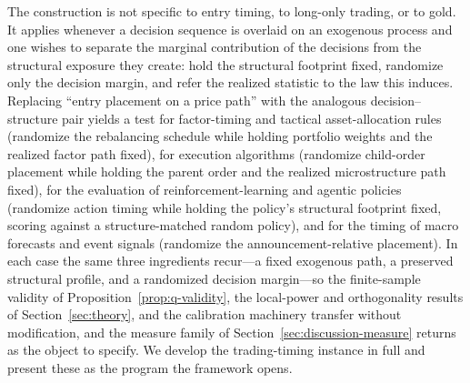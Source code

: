 The construction is not specific to entry timing, to long-only trading, or to gold. It
applies whenever a decision sequence is overlaid on an exogenous process and one wishes to
separate the marginal contribution of the decisions from the structural exposure they
create: hold the structural footprint fixed, randomize only the decision margin, and refer
the realized statistic to the law this induces. Replacing ``entry placement on a price
path'' with the analogous decision--structure pair yields a test for factor-timing and
tactical asset-allocation rules (randomize the rebalancing schedule while holding portfolio
weights and the realized factor path fixed), for execution algorithms (randomize child-order
placement while holding the parent order and the realized microstructure path fixed), for
the evaluation of reinforcement-learning and agentic policies (randomize action timing while
holding the policy's structural footprint fixed, scoring against a structure-matched random
policy), and for the timing of macro forecasts and event signals (randomize the
announcement-relative placement). In each case the same three ingredients recur---a fixed
exogenous path, a preserved structural profile, and a randomized decision margin---so the
finite-sample validity of Proposition~\ref{prop:q-validity}, the local-power and
orthogonality results of Section~\ref{sec:theory}, and the calibration machinery transfer
without modification, and the measure family of Section~\ref{sec:discussion-measure} returns
as the object to specify. We develop the trading-timing instance in full and present these
as the program the framework opens.
